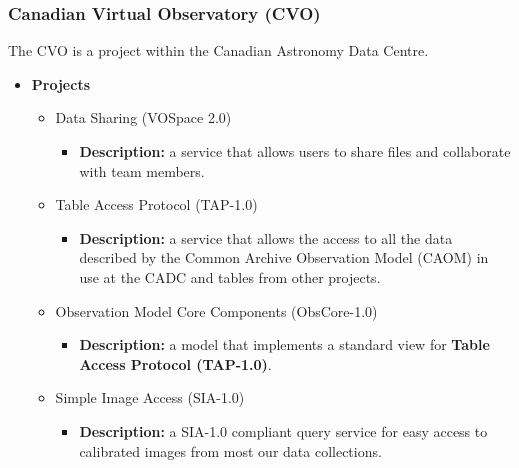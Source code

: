 \subsubsection{Canadian Virtual Observatory (CVO)}
The CVO \cite{website:cvo-home} is a project within the Canadian Astronomy Data
Centre.

\begin{itemize}
\item \textbf{Projects}
\begin{itemize}
\item Data Sharing (VOSpace 2.0)
\begin{itemize}
\item \textbf{Description:} a service that allows users to share files and
collaborate with team members.
\end{itemize}
\item Table Access Protocol (TAP-1.0)
\begin{itemize}
\item \textbf{Description:} a service that allows the access to all the data
described by the Common Archive Observation Model (CAOM) in use at the CADC and
tables from other projects.
\end{itemize}
\item Observation Model Core Components (ObsCore-1.0)
\begin{itemize}
\item \textbf{Description:} a model that implements a standard view for
\textbf{Table Access Protocol (TAP-1.0)}.
\end{itemize}
\item Simple Image Access (SIA-1.0)
\begin{itemize}
\item \textbf{Description:} a SIA-1.0 compliant query service for easy access to
calibrated images from most our data collections.
\end{itemize}
\end{itemize}
\end{itemize}

